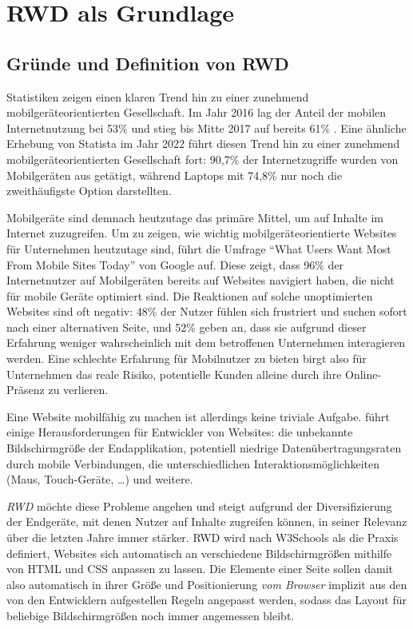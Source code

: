 \section{\ac{RWD} als Grundlage}\label{sec:responsive-webdesign-rwd-als-grundlage}

\subsection{Gründe und Definition von \ac{RWD}}\label{subsec:grunde-und-definition-von-rwd}


Statistiken zeigen einen klaren Trend hin zu einer zunehmend mobilgeräteorientierten Gesellschaft.
Im Jahr 2016 lag der Anteil der mobilen Internetnutzung bei 53\% und stieg bis Mitte 2017 auf bereits 61\% \autocite{statista.GWI.2017}.
Eine ähnliche Erhebung von Statista \autocite{statista.DataReportal.WeAreSocial.Hootsuite.2023} im Jahr 2022 führt diesen Trend hin zu einer zunehmend mobilgeräteorientierten Gesellschaft fort:
90,7\% der Internetzugriffe wurden von Mobilgeräten aus getätigt, während Laptops mit 74,8\% nur noch die zweithäufigste Option darstellten.

Mobilgeräte sind demnach heutzutage das primäre Mittel, um auf Inhalte im Internet zuzugreifen.
Um zu zeigen, wie wichtig mobilgeräteorientierte Websites für Unternehmen heutzutage sind, führt \autocite[S. 25]{Harmsen.2018} die Umfrage "`What Users Want Most From Mobile Sites Today"' von Google \autocite{Google.WhatUsersWantFromMobile.2012} auf.
Diese zeigt, dass 96\% der Internetnutzer auf Mobilgeräten bereits auf Websites navigiert haben, die nicht für mobile Geräte optimiert sind.
Die Reaktionen auf solche unoptimierten Websites sind oft negativ: 48\% der Nutzer fühlen sich frustriert und suchen sofort nach einer alternativen Seite, und 52\% geben an, dass sie aufgrund dieser Erfahrung weniger wahrscheinlich mit dem betroffenen Unternehmen interagieren werden.
Eine schlechte Erfahrung für Mobilnutzer zu bieten birgt also für Unternehmen das reale Risiko, potentielle Kunden alleine durch ihre Online-Präsenz zu verlieren.

Eine Website mobilfähig zu machen ist allerdings keine triviale Aufgabe.
\autocite[S. 25--33]{Harmsen.2018} führt einige Herausforderungen für Entwickler von Websites:
die unbekannte Bildschirmgröße der Endapplikation, potentiell niedrige Datenübertragungsraten durch mobile Verbindungen, die unterschiedlichen Interaktionsmöglichkeiten (Maus, Touch-Geräte, \ldots) und weitere.

\emph{\acl{RWD}} möchte diese Probleme angehen und steigt aufgrund der Diversifizierung der Endgeräte, mit denen Nutzer auf Inhalte zugreifen können, in seiner Relevanz über die letzten Jahre immer stärker.
\ac{RWD} wird nach W3Schools \autocite{W3Schools.ResponsiveWebDesign.2024} als die Praxis definiert, Websites sich automatisch an verschiedene Bildschirmgrößen mithilfe von \ac{HTML} und \ac{CSS} anpassen zu lassen.
Die Elemente einer Seite sollen damit also automatisch in ihrer Größe und Positionierung \emph{vom Browser} implizit aus den von den Entwicklern aufgestellen Regeln angepasst werden, sodass das Layout für beliebige Bildschirmgrößen noch immer angemessen bleibt.

